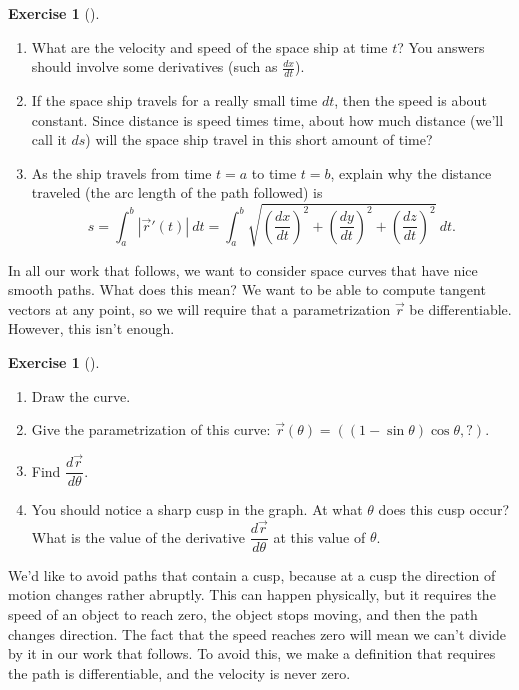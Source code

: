 \documentclass[10pt,]{book}
\theoremstyle{plain}
\theoremstyle{definition}
\theoremstyle{definition}
\theoremstyle{definition}
\theoremstyle{definition}
\newtheorem{exploration}[project]{Exercise}
\theoremstyle{definition}
\numberwithin{equation}{section}
\begin{document}
\begin{exploration}[]\label{exploration-163}
\leavevmode%
\begin{enumerate}[font=\bfseries,label=(\alph*),ref=\alph*]
\item\label{task-379} What are the velocity and speed of the space ship at time \(t\)? You answers should involve some derivatives (such as \(\frac{dx}{dt}\)).%
\item\label{task-380} If the space ship travels for a really small time \(dt\), then the speed is about constant. Since distance is speed times time, about how much distance (we'll call it \(ds\)) will the space ship travel in this short amount of time?%
\item\label{arc_length2} As the ship travels from time \(t=a\) to time \(t=b\), explain why the distance traveled (the arc length of the path followed) is%
\begin{equation*}
s=\int_a^b |\vec r '(t)|\ dt = \int_a^b \sqrt{\left(\frac{dx}{dt}\right)^2+\left(\frac{dy}{dt}\right)^2+\left(\frac{dz}{dt}\right)^2}\ dt .
\end{equation*}
%
\end{enumerate}
\end{exploration}
In all our work that follows, we want to consider space curves that have nice smooth paths. What does this mean? We want to be able to compute tangent vectors at any point, so we will require that a parametrization \(\vec r\) be differentiable. However, this isn't enough.%
\begin{exploration}[]\label{exploration-164}
\leavevmode%
\begin{enumerate}[font=\bfseries,label=(\alph*),ref=\alph*]
\item\label{task-382} Draw the curve.%
\item\label{task-383} Give the parametrization of this curve: \(\vec r(\theta) = ((1-\sin\theta)\cos\theta, ?)\).%
\item\label{task-384} Find \(\dfrac{d\vec r}{d\theta}\).%
\item\label{task-385} You should notice a sharp cusp in the graph. At what \(\theta\) does this cusp occur?  What is the value of the derivative \(\dfrac{d\vec r}{d\theta}\) at this value of \(\theta\).%
\end{enumerate}
\end{exploration}
We'd like to avoid paths that contain a cusp, because at a cusp the direction of motion changes rather abruptly. This can happen physically, but it requires the speed of an object to reach zero, the object stops moving, and then the path changes direction. The fact that the speed reaches zero will mean we can't divide by it in our work that follows. To avoid this, we make a definition that requires the path is differentiable, and the velocity is never zero.%
\end{document}
